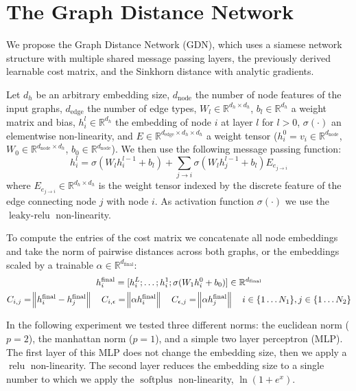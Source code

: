 \section{The Graph Distance Network}

We propose the Graph Distance Network (GDN), which uses a siamese network structure with multiple shared message passing layers, the previously derived learnable cost matrix, and the Sinkhorn distance with analytic gradients.

Let $d_h$ be an arbitrary embedding size, $d_{\text{node}}$ the number of node features of the input graphs, $d_{\text{edge}}$ the number of edge types, $W_l \in \mathbb{R}^{d_h \times d_h}$, $b_l \in   \mathbb{R}^{d_h}$ a weight matrix and bias, $h_i^l \in \mathbb{R}^{d_h}$ the embedding of node $i$ at layer $l$ for $l > 0$, $\sigma(\cdot)$ an elementwise non-linearity, and $E \in \mathbb{R}^{d_{\text{edge}} \times d_h \times d_h}$ a weight tensor ($h_i^0 = v_i \in \mathbb{R}^{d_{\text{node}}}$, $W_0 \in \mathbb{R}^{d_{\text{node}} \times d_h}$, $b_0 \in \mathbb{R}^{d_{\text{node}}}$). We then use the following message passing function:
\begin{equation}
     h_i^{l} = \sigma(W_{l} h_i^{l-1} + b_l) + \sum_{j \rightarrow i} \sigma(W_{l} h_j^{l-1} + b_l) E_{e_{j \rightarrow i}}
\end{equation}
where $E_{e_{j \rightarrow i}} \in \mathbb{R}^{d_h \times d_h}$ is the weight tensor indexed by the discrete feature of the edge connecting node $j$ with node $i$. As activation function $\sigma(\cdot)$ we use the $\operatorname{leaky-relu}$ non-linearity.

To compute the entries of the cost matrix we concatenate all node embeddings and take the norm of pairwise distances across both graphs, or the embeddings scaled by a trainable $\alpha \in \mathbb{R}^{d_\text{final}}$:
\begin{equation}
     \begin{gathered}
          h_i^\text{final} = [h_i^L ; \dots ; h_i^1 ; \sigma(W_{1} h_i^{0} + b_0)] \in \mathbb{R}^{d_\text{final}}\\
          C_{i,j} = \norm{h_i^\text{final} - h_j^\text{final}} \quad
          C_{i, \epsilon} = \norm{ \alpha h_i^\text{final}} \quad
          C_{\epsilon, j} = \norm{ \alpha h_j^\text{final}} \quad i \in \{1 \dots N_1\}, j \in \{1 \dots N_2\}
     \end{gathered}
\end{equation}

In the following experiment we tested three different norms: the euclidean norm ($p=2$), the manhattan norm ($p=1$), and a simple two layer perceptron (MLP). The first layer of this MLP does not change the embedding size, then we apply a $\operatorname{relu}$ non-linearity. The second layer reduces the embedding size to a single number to which we apply the $\operatorname{softplus}$ non-linearity, $\ln(1 + e^x)$.

